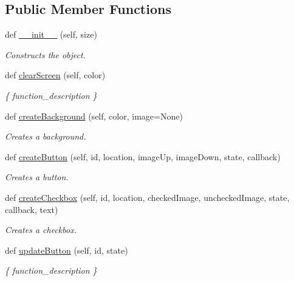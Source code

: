 \subsection*{Public Member Functions}
\begin{DoxyCompactItemize}
\item 
def \hyperlink{classez_g_f_x_1_1earth_l_c_d_1_1earth_l_c_d_a306a9a9eb6568e0be19c6d8ac665bb71}{\+\_\+\+\_\+init\+\_\+\+\_\+} (self, size)
\begin{DoxyCompactList}\small\item\em Constructs the object. \end{DoxyCompactList}\item 
def \hyperlink{classez_g_f_x_1_1earth_l_c_d_1_1earth_l_c_d_acfbcb9fb412431cf0fe4349fd503667a}{clear\+Screen} (self, color)
\begin{DoxyCompactList}\small\item\em \{ function\+\_\+description \} \end{DoxyCompactList}\item 
def \hyperlink{classez_g_f_x_1_1earth_l_c_d_1_1earth_l_c_d_a176dfa3881b7ff05ca1862f01a1461fe}{create\+Background} (self, color, image=None)
\begin{DoxyCompactList}\small\item\em Creates a background. \end{DoxyCompactList}\item 
def \hyperlink{classez_g_f_x_1_1earth_l_c_d_1_1earth_l_c_d_a3ec38493a38bd0678c8bf1375791ce91}{create\+Button} (self, id, location, image\+Up, image\+Down, state, callback)
\begin{DoxyCompactList}\small\item\em Creates a button. \end{DoxyCompactList}\item 
def \hyperlink{classez_g_f_x_1_1earth_l_c_d_1_1earth_l_c_d_a46c991c382ce6d57490d1f9241c748cf}{create\+Checkbox} (self, id, location, checked\+Image, unchecked\+Image, state, callback, text)
\begin{DoxyCompactList}\small\item\em Creates a checkbox. \end{DoxyCompactList}\item 
def \hyperlink{classez_g_f_x_1_1earth_l_c_d_1_1earth_l_c_d_a37b3d546e5bb76e53ff08174b35ec916}{update\+Button} (self, id, state)
\begin{DoxyCompactList}\small\item\em \{ function\+\_\+description \} \end{DoxyCompactList}\item 

\end{DoxyCompactItemize}
